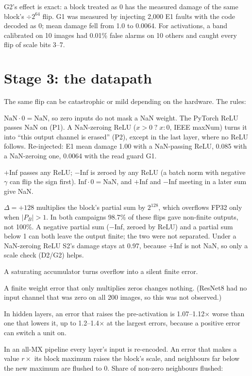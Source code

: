 \documentclass[10pt,a4paper]{article}
\begin{document}
G2's effect is exact: a block treated as 0 has the measured damage of the same block's
$\div2^{64}$ flip. G1 was measured by injecting 2,000 E1 faults with the code decoded as 0; mean
damage fell from 1.0 to 0.0064. For activations, a band calibrated on 10 images had 0.01\% false
alarms on 10 others and caught every flip of scale bits 3--7.

\section{Stage 3: the datapath}
\label{sec:datapath}

The same flip can be catastrophic or mild depending on the hardware. The rules:

\begin{description}[leftmargin=1.2em,style=nextline]
  \item[P1 / P2 NaN.] $\text{NaN}\cdot0=\text{NaN}$, so zero inputs do not mask a NaN weight. The
        PyTorch ReLU passes NaN on (P1). A NaN-zeroing ReLU ($x>0\;?\;x:0$, IEEE maxNum) turns it
        into ``this output channel is erased'' (P2), except in the last layer, where no ReLU
        follows. Re-injected: E1 mean damage 1.00 with a NaN-passing ReLU, 0.085 with a
        NaN-zeroing one, 0.0064 with the read guard G1.
  \item[P3 overflow.] $+$Inf passes any ReLU; $-$Inf is zeroed by any ReLU (a batch norm with
        negative $\gamma$ can flip the sign first). $\text{Inf}\cdot0=\text{NaN}$, and $+$Inf and
        $-$Inf meeting in a later sum give NaN.
  \item[S2 in detail.] $\Delta=+128$ multiplies the block's partial sum by $2^{128}$, which
        overflows FP32 only when $|P_B|>1$. In both campaigns 98.7\% of these flips gave
        non-finite outputs, not 100\%. A negative partial sum ($-$Inf, zeroed by ReLU) and a
        partial sum below 1 can both leave the output finite; the two were not separated.
        Under a NaN-zeroing ReLU S2's damage stays at 0.97, because $+$Inf is not NaN, so only a
        scale check (D2/G2) helps.
  \item[P4 saturation.] A saturating accumulator turns overflow into a silent finite error.
  \item[P5 zero inputs.] A finite weight error that only multiplies zeros changes nothing.
        (ResNet8 had no input channel that was zero on all 200 images, so this was not observed.)
  \item[P6 ReLU asymmetry.] In hidden layers, an error that raises the pre-activation is
        1.07--1.12$\times$ worse than one that lowers it, up to 1.2--1.4$\times$ at the largest
        errors, because a positive error can switch a unit on.
  \item[P7 re-quantisation.] In an all-MX pipeline every layer's input is re-encoded. An error
        that makes a value $r\times$ its block maximum raises the block's scale, and neighbours far
        below the new maximum are flushed to 0. Share of non-zero neighbours flushed:
\end{description}
\end{document}
